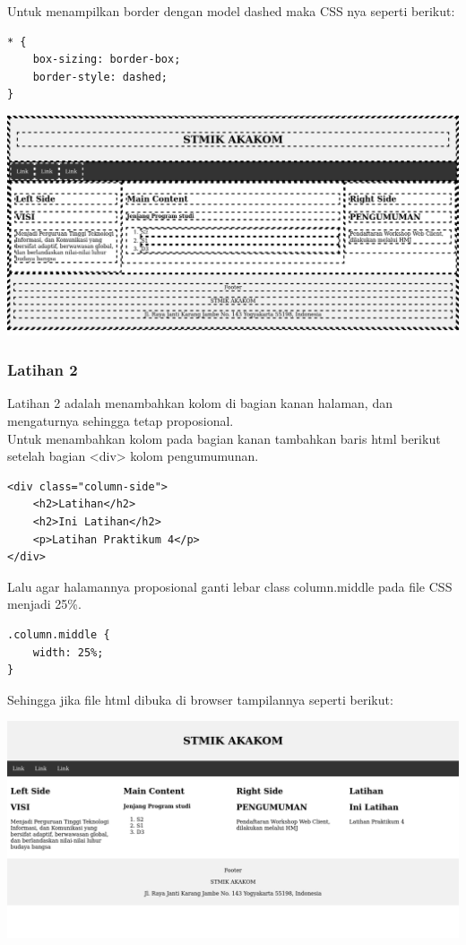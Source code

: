 \documentclass[a4paper,12pt]{article}
\begin{document}
Untuk menampilkan border dengan model dashed maka CSS nya seperti berikut:\\
\begin{lstlisting}
* {
    box-sizing: border-box;
    border-style: dashed;
}
\end{lstlisting}
\begin{center}
    \includegraphics[width=\linewidth]{4.png}
\end{center}

\subsubsection{Latihan 2}
Latihan 2 adalah menambahkan kolom di bagian kanan halaman, dan mengaturnya sehingga tetap proposional.\\
Untuk menambahkan kolom pada bagian kanan tambahkan baris html berikut setelah bagian <div> kolom pengumumunan.
\begin{lstlisting}
<div class="column-side">
    <h2>Latihan</h2>
    <h2>Ini Latihan</h2>
    <p>Latihan Praktikum 4</p>
</div>
\end{lstlisting}
Lalu agar halamannya proposional ganti lebar class column.middle pada file CSS menjadi 25\%.
\begin{lstlisting}
.column.middle {
    width: 25%;
}
\end{lstlisting}
Sehingga jika file html dibuka di browser tampilannya seperti berikut:
\begin{center}
    \includegraphics[width=\linewidth]{5.png}
\end{center}
\end{document}
